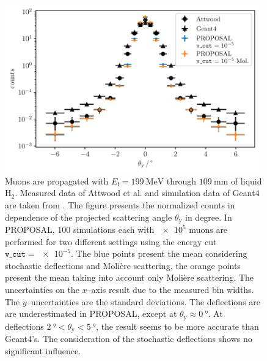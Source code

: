 \documentclass[pdflatex, sn-mathphys]{sn-jnl}%
\theoremstyle{thmstyleone}%
\theoremstyle{thmstyletwo}%
\theoremstyle{thmstylethree}%
\begin{document}
\begin{figure}
    \centering 
    \includegraphics[width=0.98\textwidth]{../../deflection/plots/FINAL/attwood_comparison_moliere_199MeV_final_multi_mean_deg.pdf}
    \caption{
    Muons are 
    propagated with $E_{\mathrm{i}} = \SI{199}{\mega\electronvolt}$ through 
    $\SI{109}{\milli\meter}$ of liquid $\text{H}_2$.
    Measured data of Attwood et al. and simulation data of Geant4 are taken from \cite{attwood_2006}.    
    The figure presents 
    the normalized counts in dependence of the projected scattering angle $\theta_{\mathrm{y}}$ in degree.
    In PROPOSAL, $100$ simulations each with $\num{e5}$ muons are performed for two different settings using the energy cut 
    $\texttt{v\_cut} = \num{e-5}$. The blue points present the mean considering stochastic deflections and Molière scattering, the orange points
    present the mean taking into account only Molière scattering.   
    The uncertainties on the $x$--axis result due to the measured bin widths. The $y$--uncertainties are the standard deviations.   
    The deflections are  
    are underestimated in PROPOSAL, except at $\theta_{\mathrm{y}} \approx \SI{0}{\degree}$. At deflections $\SI{2}{\degree} < \theta_{\mathrm{y}} < \SI{5}{\degree}$, 
    the result seems to be more accurate than Geant4's. The consideration of the stochastic deflections shows no significant influence.}
    \label{fig:attwood_comparison}
\end{figure}
\end{document}

